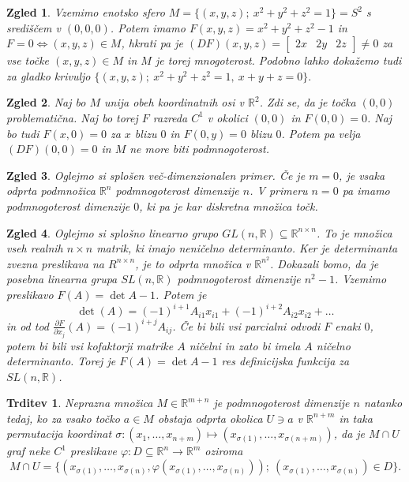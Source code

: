 \documentclass[10pt, a4paper]{article}
\newtheorem{trditev}[izr]{Trditev}
\newtheorem{zgled}{Zgled}[section]
\newcommand{\R}{\mathbb {R}}
\begin{document}
\begin{zgled}
    Vzemimo enotsko sfero $M = \{(x, y, z);\ x^2 + y^2 + z^2 = 1\} = S^2$ s središčem v $(0, 0, 0)$.
    Potem imamo $F (x, y, z) = x^2 + y^2 + z^2 - 1$ in $F = 0 \Leftrightarrow (x, y, z) \in M$,
    hkrati pa je $(DF) (x, y, z) = \begin{bmatrix}
        2x & 2y & 2z
    \end{bmatrix} \neq 0$ za vse točke $(x, y, z) \in M$ in $M$ je torej mnogoterost.
    Podobno lahko dokažemo tudi za gladko krivuljo $\{(x, y, z);\ x^2 + y^2 + z^2 = 1,\ x + y + z = 0\}.$
\end{zgled}

\begin{zgled}
    Naj bo $M$ unija obeh koordinatnih osi v $\R^2$.
    Zdi se, da je točka $(0, 0)$ problematična.
    Naj bo torej $F$ razreda $C^1$ v okolici $(0, 0)$ in $F (0, 0) = 0$.
    Naj bo tudi $F(x, 0) = 0$ za $x$ blizu $0$ in $F(0, y) = 0$ blizu $0$.
    Potem pa velja $(DF) (0, 0) = 0$ in $M$ ne more biti podmnogoterost.
\end{zgled}

\begin{zgled}
    Oglejmo si splošen več-dimenzionalen primer.
    Če je $m = 0$, je vsaka odprta podmnožica $\R^n$ podmnogoterost dimenzije $n$.
    V primeru $n = 0$ pa imamo podmnogoterost dimenzije $0$, ki pa je kar diskretna množica točk.
\end{zgled}

\begin{zgled}
    Oglejmo si splošno linearno grupo $GL(n, \R) \subseteq \R^{n \times n}$.
    To je množica vseh realnih $n \times n$ matrik, ki imajo neničelno determinanto.
    Ker je determinanta zvezna preslikava na $R^{n \times n}$, je to odprta množica v $\R^{n ^2}$.
    Dokazali bomo, da je posebna linearna grupa $SL (n, \R)$ podmnogoterost dimenzije $n^2 - 1$.
    Vzemimo preslikavo $F(A) = \det A - 1$. Potem je 
    $$\det (A) = (-1)^{i + 1} A_{i1} x_{i1} + (-1)^{i + 2} A_{i2} x_{i2} + \dots$$
    in od tod $\frac{\partial F}{\partial x_j} (A) = (-1)^{i + j} A_{ij}$.
    Če bi bili vsi parcialni odvodi $F$ enaki $0$, potem bi bili vsi kofaktorji matrike $A$ ničelni 
    in zato bi imela $A$ ničelno determinanto. Torej je $F(A) = \det A - 1$ res definicijska funkcija za 
    $SL (n, \R)$.
\end{zgled}

\begin{trditev}
    Neprazna množica $M \in \R^{m + n}$ je podmnogoterost dimenzije $n$
    natanko tedaj, ko za vsako točko $a \in M$ obstaja odprta okolica
    $U \ni a$ v $\R^{n + m}$ in taka permutacija koordinat $\sigma : (x_1, \dots, x_{n + m}) \mapsto (x_{\sigma (1)}, \dots, x_{\sigma(n + m)})$,
    da je $M \cap U$ graf neke $C^1$ preslikave $\varphi : D \subseteq \R^n \to \R^m$ oziroma 
    $$M \cap U = \{(x_{\sigma(1)}, \dots, x_{\sigma(n)}, \varphi (x_{\sigma(1)}, \dots, x_{\sigma(n)}));\ (x_{\sigma(1)}, \dots, x_{\sigma(n)}) \in D\}.$$ 
\end{trditev}
\end{document}
